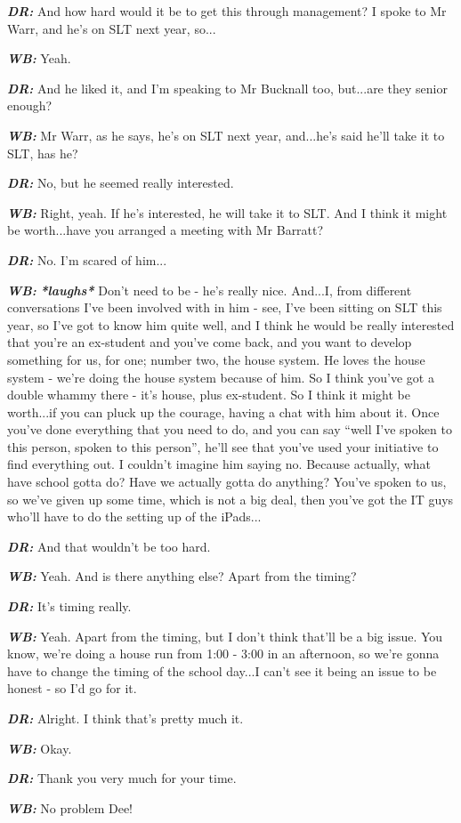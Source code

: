 \textit{\textbf{DR:}} And how hard would it be to get this through management? I spoke to Mr Warr, and he's on SLT next year, so...

\textit{\textbf{WB:}} Yeah.

\textit{\textbf{DR:}} And he liked it, and I'm speaking to Mr Bucknall too, but...are they senior enough?

\textit{\textbf{WB:}} Mr Warr, as he says, he's on SLT next year, and...he's said he'll take it to SLT, has he?

\textit{\textbf{DR:}} No, but he seemed really interested.

\textit{\textbf{WB:}} Right, yeah. If he's interested, he will take it to SLT. And I think it might be worth...have you arranged a meeting with Mr Barratt?

\textit{\textbf{DR:}} No. I'm scared of him...

\textit{\textbf{WB:}} \textit{\textbf{*laughs*}} Don't need to be - he's really nice. And...I, from different conversations I've been involved with in him - see, I've been sitting on SLT this year, so I've got to know him quite well, and I think he would be really interested that you're an ex-student and you've come back, and you want to develop something for us, for one; number two, the house system. He loves the house system - we're doing the house system because of him. So I think you've got a double whammy there - it's house, plus ex-student. So I think it might be worth...if you can pluck up the courage, having a chat with him about it. Once you've done everything that you need to do, and you can say ``well I've spoken to this person, spoken to this person'', he'll see that you've used your initiative to find everything out. I couldn't imagine him saying no. Because actually, what have school gotta do? Have we actually gotta do anything? You've spoken to us, so we've given up some time, which is not a big deal, then you've got the IT guys who'll have to do the setting up of the iPads...

\textit{\textbf{DR:}} And that wouldn't be too hard.

\textit{\textbf{WB:}} Yeah. And is there anything else? Apart from the timing?

\textit{\textbf{DR:}} It's timing really.

\textit{\textbf{WB:}} Yeah. Apart from the timing, but I don't think that'll be a big issue. You know, we're doing a house run from 1:00 - 3:00 in an afternoon, so we're gonna have to change the timing of the school day...I can't see it being an issue to be honest - so I'd go for it.

\textit{\textbf{DR:}} Alright. I think that's pretty much it.

\textit{\textbf{WB:}} Okay.

\textit{\textbf{DR:}} Thank you very much for your time.

\textit{\textbf{WB:}} No problem Dee!
